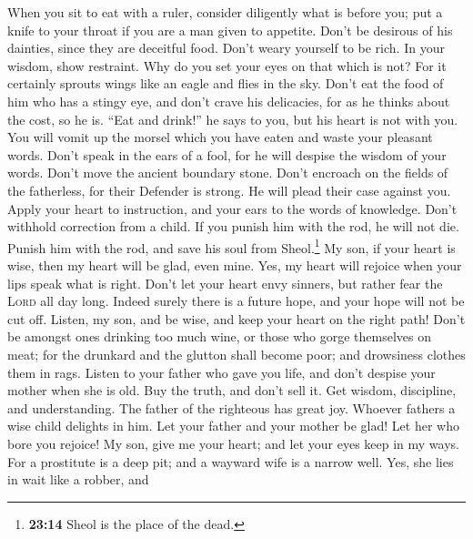  When you sit to eat with a ruler, consider diligently
what is before you;  put a knife to your throat if you are
a man given to appetite.  Don't be desirous of his
dainties, since they are deceitful food.  Don't weary
yourself to be rich. In your wisdom, show restraint.  Why
do you set your eyes on that which is not? For it certainly sprouts
wings like an eagle and flies in the sky.  Don't eat the
food of him who has a stingy eye, and don't crave his delicacies,
 for as he thinks about the cost, so he is. ``Eat and
drink!'' he says to you, but his heart is not with you. 
You will vomit up the morsel which you have eaten and waste your
pleasant words.  Don't speak in the ears of a fool, for he
will despise the wisdom of your words.  Don't move the
ancient boundary stone. Don't encroach on the fields of the fatherless,
 for their Defender is strong. He will plead their case
against you.  Apply your heart to instruction, and your
ears to the words of knowledge.  Don't withhold
correction from a child. If you punish him with the rod, he will not
die.  Punish him with the rod, and save his soul from
Sheol.\footnote{\textbf{23:14} Sheol is the place of the dead.}
 My son, if your heart is wise, then my heart will be
glad, even mine.  Yes, my heart will rejoice when your
lips speak what is right.  Don't let your heart envy
sinners, but rather fear the \textsc{Lord} all day long. 
Indeed surely there is a future hope, and your hope will not be cut off.
 Listen, my son, and be wise, and keep your heart on the
right path!  Don't be amongst ones drinking too much
wine, or those who gorge themselves on meat;  for the
drunkard and the glutton shall become poor; and drowsiness clothes them
in rags.  Listen to your father who gave you life, and
don't despise your mother when she is old.  Buy the
truth, and don't sell it. Get wisdom, discipline, and understanding.
 The father of the righteous has great joy. Whoever
fathers a wise child delights in him.  Let your father
and your mother be glad! Let her who bore you rejoice! 
My son, give me your heart; and let your eyes keep in my ways.
 For a prostitute is a deep pit; and a wayward wife is a
narrow well.  Yes, she lies in wait like a robber, and
